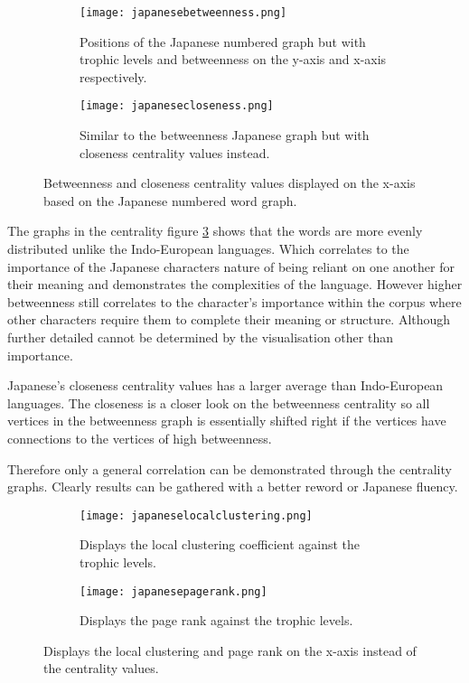 \begin{figure}[H]
\centering
\begin{subfigure}{.45\textwidth}
	\hspace{-1cm} 
	\texttt{[image: japanesebetweenness.png]}
	\caption{Positions of the Japanese numbered graph but with trophic levels and betweenness on the y-axis and x-axis respectively.}
	\label{fig:jpbc}
\end{subfigure}
\hfill
\begin{subfigure}{.45\textwidth}
	\hspace{-1cm} 
	\texttt{[image: japanesecloseness.png]}
	\caption{Similar to the betweenness Japanese graph but with closeness centrality values instead. }
	\label{fig:jpcc}
\end{subfigure}
\caption{Betweenness and closeness centrality values displayed on the x-axis based on the Japanese numbered word graph.}
\label{fig:jpcentrality}
\end{figure}

The graphs in the centrality figure \ref{fig:jpcentrality} shows that the words are more evenly distributed unlike the Indo-European languages. Which correlates to the importance of the Japanese characters nature of being reliant on one another for their meaning and demonstrates the complexities of the language. However higher betweenness still correlates to the character's importance within the corpus where other characters require them to complete their meaning or structure. Although further detailed cannot be determined by the visualisation other than importance.

Japanese's closeness centrality values has a larger average than Indo-European languages. The closeness is a closer look on the betweenness centrality so all vertices in the betweenness graph is essentially shifted right if the vertices have connections to the vertices of high betweenness.

Therefore only a general correlation can be demonstrated through the centrality graphs. Clearly results can be gathered with a better reword or Japanese fluency.

\begin{figure}[H]
\centering
\begin{subfigure}{.45\textwidth}
	\hspace{-1cm} 
	\texttt{[image: japaneselocalclustering.png]}
	\caption{Displays the local clustering coefficient against the trophic levels.}
	\label{fig:jplc}
\end{subfigure}
\hfill
\begin{subfigure}{.45\textwidth}
	\hspace{-1cm} 
	\texttt{[image: japanesepagerank.png]}
	\caption{Displays the page rank against the trophic levels.}
	\label{fig:jppr}
\end{subfigure}
\caption{Displays the local clustering and page rank on the x-axis instead of the centrality values.}
\label{fig:jpother}
\end{figure}

